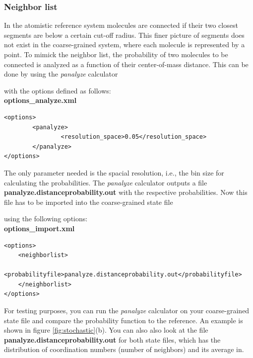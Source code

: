 \subsubsection{Neighbor list}

In the atomistic reference system molecules are connected if their two closest segments are below a certain cut-off radius. This finer picture of segments does not exist in the coarse-grained system, where each molecule is represented by a point. To mimick the neighbor list, the probability of two molecules to be connected is analyzed as a function of their center-of-mass distance. This can be done by using the \emph{panalyze} calculator


with the options defined as follows:
\\

\textbf{options\_analyze.xml}

\lstset{language=XML2}
\begin{lstlisting}
<options>
        <panalyze>
                <resolution_space>0.05</resolution_space>
        </panalyze>
</options>
\end{lstlisting}

The only parameter needed is the spacial resolution, i.e., the bin size for calculating the probabilities. The \emph{panalyze} calculator outputs a file \textbf{panalyze.distanceprobability.out} with the respective probabilities.
Now this file has to be imported into the coarse-grained state file


using the following options:
\\

\textbf{options\_import.xml}

\lstset{language=XML2}
\begin{lstlisting}
<options>
	<neighborlist>
                <probabilityfile>panalyze.distanceprobability.out</probabilityfile>
	</neighborlist>
</options>
\end{lstlisting}

For testing purposes, you can run the \emph{panalyze} calculator on your coarse-grained state file and compare the probability function to the reference. An example is shown in figure \ref{fig:stochastic}(b). You can also also look at the file \textbf{panalyze.distanceprobability.out} for both state files, which has the distribution of coordination numbers (number of neighbors) and its average in.

